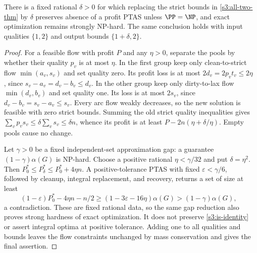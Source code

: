 \begin{proposition}\label{s3:tolerance}
There is a fixed rational $\delta>0$ for which replacing the strict
bounds in \cref{s3:all-two-thm} by $\delta$ preserves absence of a profit
PTAS unless $\PP=\NP$, and exact optimization remains strongly NP-hard.
The same conclusion holds with input qualities $\{1,2\}$ and output
bounds $\{1+\delta,2\}$.
\end{proposition}
\begin{proof}
For a feasible flow with profit $P$ and any $\eta>0$, separate the pools
by whether their quality $p_v$ is at most $\eta$. In the first group keep
only clean-to-strict flow $\min(a_v,s_v)$ and set quality zero. Its profit
loss is at most $2d_v=2p_vt_v\le2\eta$, since
$s_v-a_v=d_v-b_v\le d_v$. In the other group keep only dirty-to-lax
flow $\min(d_v,b_v)$ and set quality one. Its loss is at most $2s_v$,
since $d_v-b_v=s_v-a_v\le s_v$. Every arc flow weakly decreases,
so the new solution is feasible with zero strict bounds. Summing the
old strict quality inequalities gives
$\sum_v p_vs_v\le\delta\sum_v s_v\le\delta n$, whence its profit is
at least $P-2n(\eta+\delta/\eta)$. Empty pools cause no change.

Let $\gamma>0$ be a fixed independent-set approximation gap: a guarantee
$(1-\gamma)\alpha(G)$ is NP-hard. Choose a positive rational
$\eta<\gamma/32$ and put $\delta=\eta^2$. Then
$P_0^*\le P_\delta^*\le P_0^*+4\eta n$.
A positive-tolerance PTAS with fixed $\varepsilon<\gamma/6$, followed
by cleanup, integral replacement, and recovery, returns a set of size
at least
\[
 (1-\varepsilon)P_0^*-4\eta n-n/2
 \ge(1-3\varepsilon-16\eta)\alpha(G)
 >(1-\gamma)\alpha(G),
\]
a contradiction. These are fixed rational data, so the same gap reduction
also proves strong hardness of exact optimization. It does not preserve
\eqref{s3:is-identity} or assert integral optima at positive tolerance.
Adding one to all qualities and bounds leaves the flow constraints
unchanged by mass conservation and gives the final assertion.
\end{proof}

